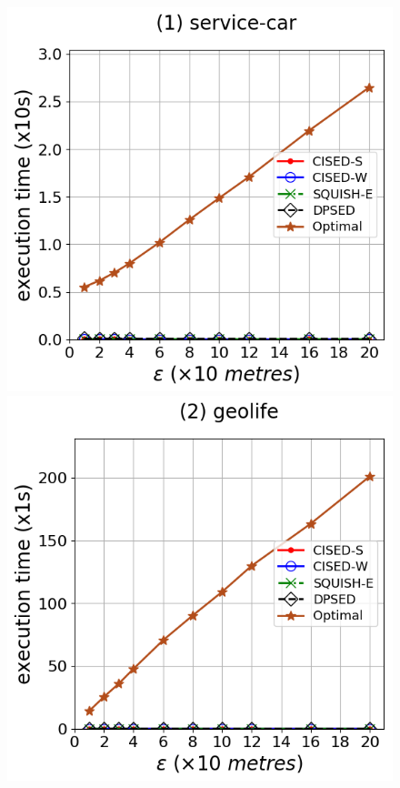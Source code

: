 {\begin{figure}[tb!]
\centering
\includegraphics[scale = 0.275]{Figures/Exp-opt-time-epsilon-service.png}\hspace{3ex}
\includegraphics[scale = 0.275]{Figures/Exp-opt-time-epsilon-geolife.png}\hspace{3ex}

\end{figure}}
